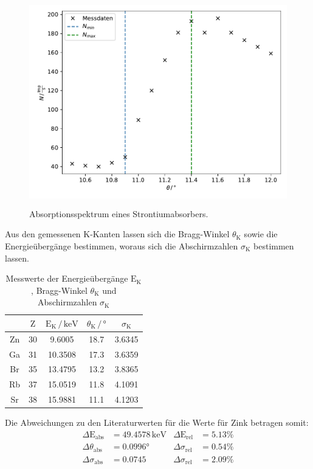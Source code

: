 \begin{figure}
    \centering
       \includegraphics[height=9cm]{daten/strontium.pdf}
       \caption{Absorptionsspektrum eines Strontiumabsorbers.}
       \label{fig:strontium}
\end{figure}

\noindent
Aus den gemessenen K-Kanten lassen sich die Bragg-Winkel $\theta_\text{K}$ sowie die Energieübergänge bestimmen,
woraus sich die Abschirmzahlen $\sigma_\text{K}$ bestimmen lassen.

\begin{table}
    \centering
    \caption{Messwerte der Energieübergänge $\text{E}_\text{K}$, Bragg-Winkel $\theta_\text{K}$ und Abschirmzahlen $\sigma_\text{K}$}
    \label{tab:mess3}
    \begin{tabular}{c c c c c}
    \toprule
         & $\text{Z}$ & $\text{E}_\text{K} \,/\, \mathrm{keV}$ & $\theta_\text{K} \,/\, ° $ & $\sigma_\text{K} $\\
    \midrule 
      Zn & 30 & 9.6005  & 18.7 & 3.6345 \\
      Ga & 31 & 10.3508 & 17.3 & 3.6359 \\
      Br & 35 & 13.4795 & 13.2 & 3.8365 \\
      Rb & 37 & 15.0519 & 11.8 & 4.1091 \\
      Sr & 38 & 15.9881 & 11.1 & 4.1203 \\
    \bottomrule
    \end{tabular}
    \end{table}

Die Abweichungen zu den Literaturwerten für die Werte für Zink betragen somit:
\begin{align*}
    \Delta\text{E}_\text{abs}&=49.4578 \, \mathrm{keV} & \Delta\text{E}_\text{rel}&=5.13\%\\
    \Delta\theta_\text{abs}&=0.0996° & \Delta\sigma_\text{rel}&=0.54\%\\
    \Delta\sigma_\text{abs}&=0.0745 & \Delta\sigma_\text{rel}&=2.09\%
\end{align*}

